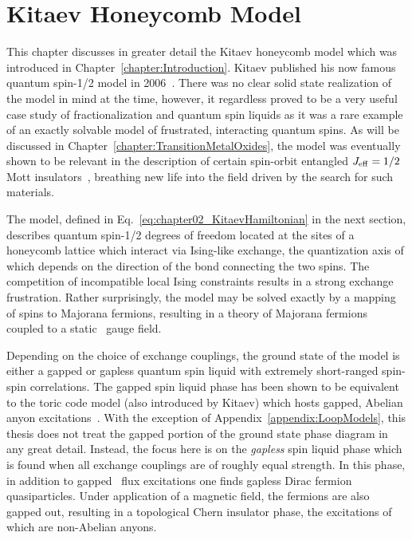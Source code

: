 \chapter{Kitaev Honeycomb Model}
\label{chapter:KitaevHoneycombModel}
%
%
This chapter discusses in greater detail the Kitaev honeycomb model which was introduced in Chapter~\ref{chapter:Introduction}.
Kitaev published his now famous quantum spin-1/2 model in 2006~\cite{KitaevAoP2006}.
There was no clear solid state realization of the model in mind at the time, however, it regardless proved to be a very useful case study of fractionalization and quantum spin liquids as it was a rare example of an exactly solvable model of frustrated, interacting quantum spins.
As will be discussed in Chapter~\ref{chapter:TransitionMetalOxides}, the model was eventually shown to be relevant in the description of certain spin-orbit entangled $J_{\rm eff} = 1/2$ Mott insulators~\cite{JackeliPRL2009}, breathing new life into the field driven by the search for such materials.

The model, defined in Eq.~\eqref{eq:chapter02_KitaevHamiltonian} in the next section, describes quantum spin-1/2 degrees of freedom located at the sites of a honeycomb lattice which interact via Ising-like exchange, the quantization axis of which depends on the direction of the bond connecting the two spins.
The competition of incompatible local Ising constraints results in a strong exchange frustration.
Rather surprisingly, the model may be solved exactly by a mapping of spins to Majorana fermions, resulting in a theory of Majorana fermions coupled to a static \ZZ~gauge field.

Depending on the choice of exchange couplings, the ground state of the model is either a gapped or gapless quantum spin liquid with extremely short-ranged spin-spin correlations.
The gapped spin liquid phase has been shown to be equivalent to the toric code model (also introduced by Kitaev) which hosts gapped, Abelian anyon excitations~\cite{KitaevAoP2003,KitaevAoP2006}.
With the exception of Appendix~\ref{appendix:LoopModels}, this thesis does not treat the gapped portion of the ground state phase diagram in any great detail.
Instead, the focus here is on the \textit{gapless} spin liquid phase which is found when all exchange couplings are of roughly equal strength.
In this phase, in addition to gapped \ZZ~flux excitations one finds gapless Dirac fermion quasiparticles.
Under application of a magnetic field, the fermions are also gapped out, resulting in a topological Chern insulator phase, the excitations of which are non-Abelian anyons.

